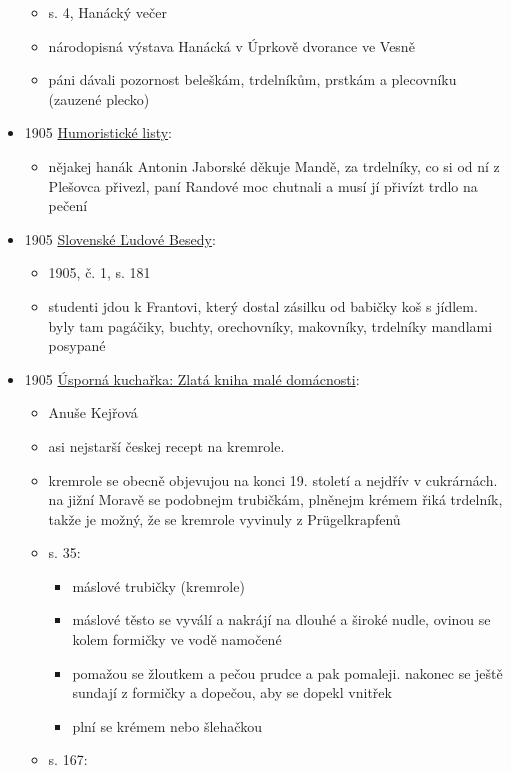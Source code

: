 \begin{itemize}
  \begin{itemize}
  \tightlist
  \item
    s. 4, Hanácký večer
  \item
    národopisná výstava Hanácká v Úprkově dvorance ve Vesně
  \item
    páni dávali pozornost beleškám, trdelníkům, prstkám a plecovníku
    (zauzené plecko)
  \end{itemize}
\item
  1905
  \href{https://ceskadigitalniknihovna.cz/uuid/uuid:e6cc2207-435d-11dd-b505-00145e5790ea}{Humoristické
  listy}:

  \begin{itemize}
  \tightlist
  \item
    nějakej hanák Antonin Jaborské děkuje Mandě, za trdelníky, co si od
    ní z Plešovca přivezl, paní Randové moc chutnali a musí jí přivízt
    trdlo na pečení
  \end{itemize}
\item
  1905
  \href{https://dikda.snk.sk/uuid/uuid:f4689941-92c2-4efa-b830-9c02c5e1dbf7}{Slovenské
  Ľudové Besedy}:

  \begin{itemize}
  \tightlist
  \item
    1905, č. 1, s. 181
  \item
    studenti jdou k Frantovi, který dostal zásilku od babičky koš s
    jídlem. byly tam pagáčiky, buchty, orechovníky, makovníky, trdelníky
    mandlami posypané
  \end{itemize}
\item
  1905
  \href{https://ceskadigitalniknihovna.cz/uuid/uuid:92266300-0c11-11ed-9dda-5ef3fc9bb22f}{Úsporná
  kuchařka: Zlatá kniha malé domácnosti}:

  \begin{itemize}
  \tightlist
  \item
    Anuše Kejřová
  \item
    asi nejstarší českej recept na kremrole.
  \item
    kremrole se obecně objevujou na konci 19. století a nejdřív v
    cukrárnách. na jižní Moravě se podobnejm trubičkám, plněnejm krémem
    řiká trdelník, takže je možný, že se kremrole vyvinuly z
    Prügelkrapfenů
  \item
    s. 35:

    \begin{itemize}
    \tightlist
    \item
      máslové trubičky (kremrole)
    \item
      máslové těsto se vyválí a nakrájí na dlouhé a široké nudle, ovinou
      se kolem formičky ve vodě namočené
    \item
      pomažou se žloutkem a pečou prudce a pak pomaleji. nakonec se
      ještě sundají z formičky a dopečou, aby se dopekl vnitřek
    \item
      plní se krémem nebo šlehačkou
    \end{itemize}
  \item
    s. 167:


\end{itemize}
\end{itemize}

